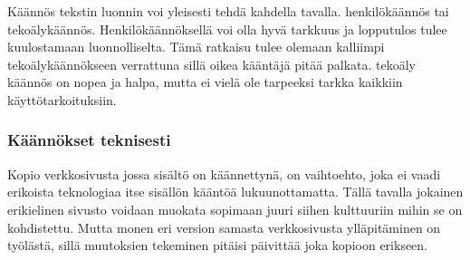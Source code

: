 \documentclass[11pt,a4paper,titlepage,oneside]{article}
\begin{document}
Käännös tekstin luonnin voi yleisesti tehdä kahdella tavalla. henkilökäännös tai tekoälykäännös.
Henkilökäännöksellä voi olla hyvä tarkkuus ja lopputulos tulee kuulostamaan luonnolliselta.
Tämä ratkaisu tulee olemaan kalliimpi tekoälykäännökseen verrattuna sillä oikea kääntäjä pitää palkata.
tekoäly käännös on nopea ja halpa, mutta ei vielä ole tarpeeksi tarkka kaikkiin käyttötarkoituksiin.
\medskip









\subsubsection{Käännökset teknisesti}




%








Kopio verkkosivusta jossa sisältö on käännettynä, on vaihtoehto, joka ei vaadi erikoista teknologiaa itse sisällön kääntöä lukuunottamatta.
Tällä tavalla jokainen erikielinen sivusto voidaan muokata sopimaan juuri siihen kulttuuriin mihin se on kohdistettu.
Mutta monen eri version samasta verkkosivusta ylläpitäminen on työlästä, sillä muutoksien tekeminen pitäisi päivittää joka kopioon erikseen.
\medskip



\end{document}
